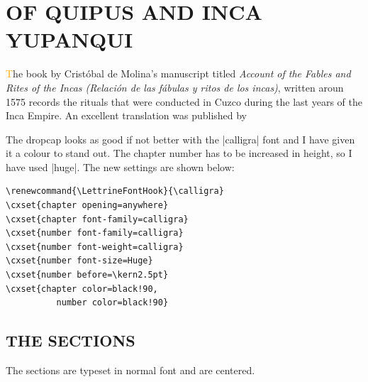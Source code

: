 \renewcommand{\LettrineFontHook}{\calligra}
\bigskip

\topline

\chapter{OF QUIPUS AND INCA YUPANQUI}

\lettrine[loversize=.6]{\textcolor{orange}{T}}{}he book by Crist\'obal de Molina’s manuscript titled \emph{Account of the Fables and Rites of the Incas (Relación
de las fábulas y ritos de los incas)}, written aroun 1575 records the rituals that were conducted in Cuzco during the last years of the Inca Empire. An excellent translation was published by
\medskip

The dropcap looks as good if not better with the |calligra| font and I have given it a colour to stand out. The chapter number has to be increased in height, so I have used |huge|. The new
settings are shown below:

\begin{verbatim}
\renewcommand{\LettrineFontHook}{\calligra}
\cxset{chapter opening=anywhere}
\cxset{chapter font-family=calligra}
\cxset{number font-family=calligra}
\cxset{number font-weight=calligra}
\cxset{number font-size=Huge}
\cxset{number before=\kern2.5pt}
\cxset{chapter color=black!90,
          number color=black!90}
\end{verbatim}



\section{THE SECTIONS}

The sections are typeset in normal font and are centered.

\bottomline 